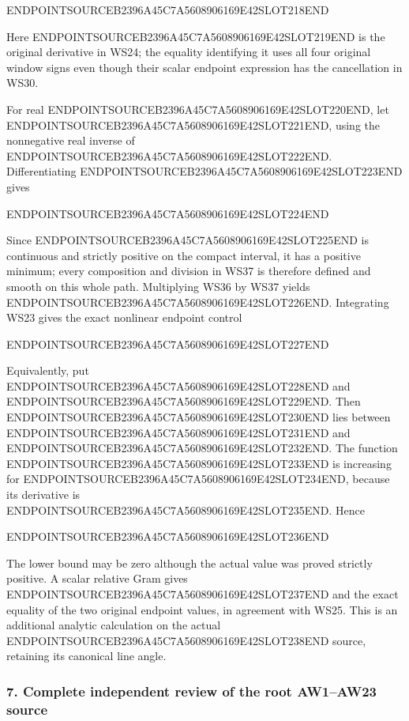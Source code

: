 ENDPOINTSOURCEB2396A45C7A5608906169E42SLOT218END

Here ENDPOINTSOURCEB2396A45C7A5608906169E42SLOT219END is the original derivative in WS24; the equality identifying it uses all four original window signs even though their scalar endpoint expression has the cancellation in WS30.

For real ENDPOINTSOURCEB2396A45C7A5608906169E42SLOT220END, let ENDPOINTSOURCEB2396A45C7A5608906169E42SLOT221END, using the nonnegative real inverse of ENDPOINTSOURCEB2396A45C7A5608906169E42SLOT222END. Differentiating ENDPOINTSOURCEB2396A45C7A5608906169E42SLOT223END gives

ENDPOINTSOURCEB2396A45C7A5608906169E42SLOT224END

Since ENDPOINTSOURCEB2396A45C7A5608906169E42SLOT225END is continuous and strictly positive on the compact interval, it has a positive minimum; every composition and division in WS37 is therefore defined and smooth on this whole path. Multiplying WS36 by WS37 yields ENDPOINTSOURCEB2396A45C7A5608906169E42SLOT226END. Integrating WS23 gives the exact nonlinear endpoint control

ENDPOINTSOURCEB2396A45C7A5608906169E42SLOT227END

Equivalently, put ENDPOINTSOURCEB2396A45C7A5608906169E42SLOT228END and ENDPOINTSOURCEB2396A45C7A5608906169E42SLOT229END. Then ENDPOINTSOURCEB2396A45C7A5608906169E42SLOT230END lies between ENDPOINTSOURCEB2396A45C7A5608906169E42SLOT231END and ENDPOINTSOURCEB2396A45C7A5608906169E42SLOT232END. The function ENDPOINTSOURCEB2396A45C7A5608906169E42SLOT233END is increasing for ENDPOINTSOURCEB2396A45C7A5608906169E42SLOT234END, because its derivative is ENDPOINTSOURCEB2396A45C7A5608906169E42SLOT235END. Hence

ENDPOINTSOURCEB2396A45C7A5608906169E42SLOT236END

The lower bound may be zero although the actual value was proved strictly positive. A scalar relative Gram gives ENDPOINTSOURCEB2396A45C7A5608906169E42SLOT237END and the exact equality of the two original endpoint values, in agreement with WS25. This is an additional analytic calculation on the actual ENDPOINTSOURCEB2396A45C7A5608906169E42SLOT238END source, retaining its canonical line angle.

\subsubsection{7. Complete independent review of the root AW1--AW23 source}\label{endpoint-window_review--complete-independent-review-of-the-root-aw1aw23-source}

